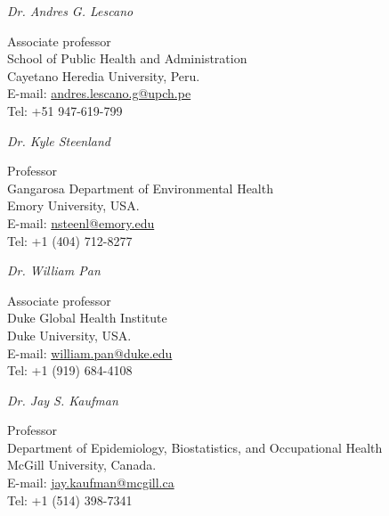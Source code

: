 \documentclass[10pt]{article}
\newenvironment{innerlist}[1][\enskip$\circ$]%
{\begin{compactitem}[#1]}{\end{compactitem}}
\begin{document}
\vspace{0.05in}
\textit{Dr. Andres G. Lescano}
\begin{innerlist}
	\item[] Associate professor \\
	School of Public Health and Administration\\
	Cayetano Heredia University, Peru.		\\
	E-mail: \href{mailto:andres.lescano.g@upch.pe}{andres.lescano.g@upch.pe} \\
	Tel: +51 947-619-799
\end{innerlist}


\vspace{0.05in}
\textit{Dr. Kyle Steenland}
\begin{innerlist}
	\item[] Professor \\
	Gangarosa Department of Environmental Health\\
	Emory University, USA.		\\
	E-mail: \href{mailto:nsteenl@emory.edu}{nsteenl@emory.edu} \\
	Tel: +1 (404) 712-8277
\end{innerlist}


\vspace{0.05in}
\textit{Dr. William Pan}
\begin{innerlist}
	\item[] Associate professor \\
	Duke Global Health Institute \\
	Duke University, USA.		\\
	E-mail: \href{mailto:william.pan@duke.edu}{william.pan@duke.edu} \\
	Tel: +1 (919) 684-4108
\end{innerlist}

\vspace{0.05in}
\textit{Dr. Jay S. Kaufman}
\begin{innerlist}
	\item[] Professor \\
	Department of Epidemiology, Biostatistics, and Occupational Health\\
	McGill University, Canada.		\\
	E-mail: \href{mailto:jay.kaufman@mcgill.ca}{jay.kaufman@mcgill.ca} \\
	Tel: +1 (514) 398-7341
\end{innerlist}


	
\end{document}
